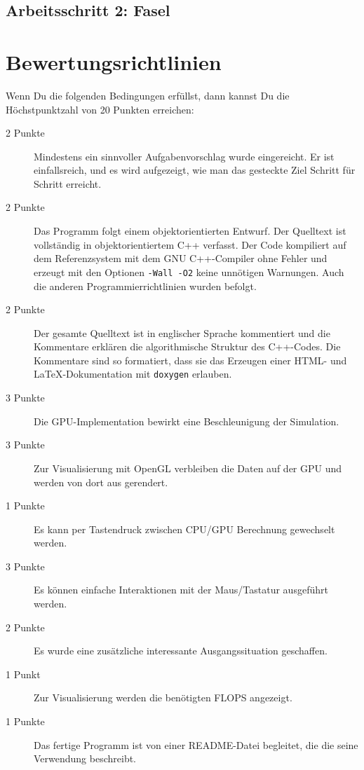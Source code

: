 \documentclass[10pt]{article}
\begin{document}
\begin{multicols}{2}
\subsection{Arbeitsschritt 2: Fasel}

\section{Bewertungsrichtlinien}

Wenn Du die folgenden Bedingungen erfüllst, dann kannst Du die
Höchstpunktzahl von 20 Punkten erreichen:

\begin{description}
\item[2 Punkte]
        Mindestens ein sinnvoller Aufgabenvorschlag wurde eingereicht.
        Er ist einfallsreich, und es wird aufgezeigt, wie man das gesteckte Ziel
        Schritt für Schritt erreicht.
\item[2 Punkte]
        Das Programm folgt einem objektorientierten Entwurf.
        Der Quelltext ist vollständig in objektorientiertem C++ verfasst.
        Der Code kompiliert auf dem Referenzsystem mit dem GNU C++-Compiler
        ohne Fehler und erzeugt mit den Optionen \texttt{-Wall -O2} keine
        unnötigen Warnungen.
        Auch die anderen Programmierrichtlinien wurden befolgt.
\item[2 Punkte]
        Der gesamte Quelltext ist in englischer Sprache kommentiert und
        die Kommentare erklären die algorithmische Struktur des C++-Codes.
        Die Kommentare sind so formatiert, dass sie das Erzeugen einer
        HTML- und \LaTeX-Dokumentation mit \texttt{doxygen} erlauben. 
\item[3 Punkte] 
        Die GPU-Implementation bewirkt eine Beschleunigung der Simulation.
\item[3 Punkte] 
        Zur Visualisierung mit OpenGL verbleiben die Daten auf der GPU und werden von dort aus gerendert.
\item[1 Punkte]
        Es kann per Tastendruck zwischen CPU/GPU Berechnung gewechselt werden.
\item[3 Punkte] 
        Es können einfache Interaktionen mit der Maus/Tastatur ausgeführt werden.
\item[2 Punkte]
        Es wurde eine zusätzliche interessante Ausgangssituation geschaffen.
\item[1 Punkt]
        Zur Visualisierung werden die benötigten FLOPS angezeigt.
\item[1 Punkte] 
        Das fertige Programm ist von einer README-Datei begleitet, die die
        seine Verwendung beschreibt.

\end{description}




\nocite{*}


\end{multicols}
\end{document}

